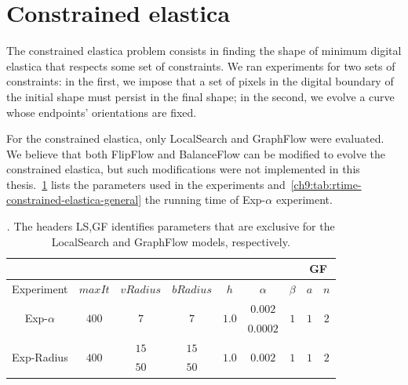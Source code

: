 \section{Constrained elastica}

The constrained elastica problem consists in finding the shape of minimum digital elastica that respects some set of constraints. We ran experiments for two sets of constraints: in the first, we impose that a set of pixels in the digital boundary of the initial shape must persist in the final shape; in the second, we evolve a curve whose endpoints' orientations are fixed. 

For the constrained elastica, only LocalSearch and GraphFlow were evaluated. We believe that both FlipFlow and BalanceFlow can be modified to evolve the constrained elastica, but such modifications were not implemented in this thesis.~\cref{ch9:tab:constrained-elastica-parameters-summary} lists the parameters used in the experiments and~\cref{ch9:tab:rtime-constrained-elastica-general} the running time of Exp-$\alpha$ experiment.

\begin{table}
\centering
\begin{tabular}{|c|c|c|c|c|c|c|c|c|}
\cline{8-9}
\multicolumn{7}{c|}{} & \multicolumn{2}{|c|}{GF}\\
\hline
Experiment & $maxIt$ & $vRadius$ & $bRadius$ & $h$ & $\alpha$ & $\beta$ & $a$ & $n$ \\
\hline
\multirow{2}{*}{Exp-$\alpha$} & \multirow{2}{*}{$400$} & \multirow{2}{*}{$7$} & \multirow{2}{*}{$7$} & \multirow{2}{*}{$1.0$} & $0.002$ & \multirow{2}{*}{$1$} & \multirow{2}{*}{$1$} & \multirow{2}{*}{$2$} \\
& & & & & $0.0002$ & & &\\
\hline
\multirow{2}{*}{Exp-Radius} & \multirow{2}{*}{$400$} & $15$ & $15$ & \multirow{2}{*}{$1.0$} & \multirow{2}{*}{$0.002$} & \multirow{2}{*}{$1$} & \multirow{2}{*}{$1$} & \multirow{2}{*}{$2$} \\
& & $50$ & $50$ & & & & &\\
\hline
\end{tabular}
\caption{. The headers LS,GF identifies parameters that are exclusive for the LocalSearch and GraphFlow models, respectively.}
\label{ch9:tab:constrained-elastica-parameters-summary}
\end{table}

